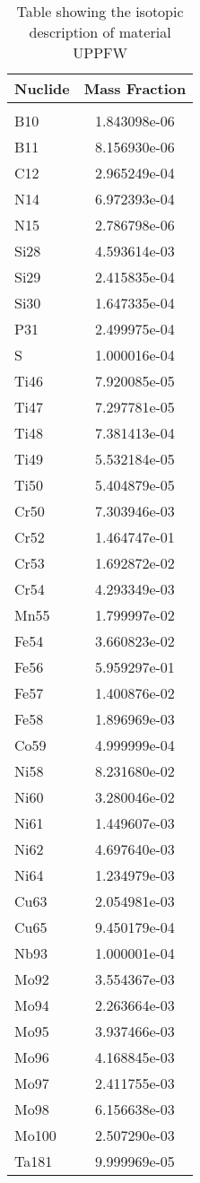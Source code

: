 \begin{centering}
\begin{table}[ht!]
\begin{tabular}{l | c}
\hline
Nuclide & Mass Fraction\\
\hline
\\
B10 & 1.843098e-06\\
B11 & 8.156930e-06\\
C12 & 2.965249e-04\\
N14 & 6.972393e-04\\
N15 & 2.786798e-06\\
Si28 & 4.593614e-03\\
Si29 & 2.415835e-04\\
Si30 & 1.647335e-04\\
P31 & 2.499975e-04\\
S & 1.000016e-04\\
Ti46 & 7.920085e-05\\
Ti47 & 7.297781e-05\\
Ti48 & 7.381413e-04\\
Ti49 & 5.532184e-05\\
Ti50 & 5.404879e-05\\
Cr50 & 7.303946e-03\\
Cr52 & 1.464747e-01\\
Cr53 & 1.692872e-02\\
Cr54 & 4.293349e-03\\
Mn55 & 1.799997e-02\\
Fe54 & 3.660823e-02\\
Fe56 & 5.959297e-01\\
Fe57 & 1.400876e-02\\
Fe58 & 1.896969e-03\\
Co59 & 4.999999e-04\\
Ni58 & 8.231680e-02\\
Ni60 & 3.280046e-02\\
Ni61 & 1.449607e-03\\
Ni62 & 4.697640e-03\\
Ni64 & 1.234979e-03\\
Cu63 & 2.054981e-03\\
Cu65 & 9.450179e-04\\
Nb93 & 1.000001e-04\\
Mo92 & 3.554367e-03\\
Mo94 & 2.263664e-03\\
Mo95 & 3.937466e-03\\
Mo96 & 4.168845e-03\\
Mo97 & 2.411755e-03\\
Mo98 & 6.156638e-03\\
Mo100 & 2.507290e-03\\
Ta181 & 9.999969e-05
\end{tabular}
\caption{Table showing the isotopic description of material UPPFW}
\label{table:material_UPPFW}
\end{table}\clearpage


\end{centering}
